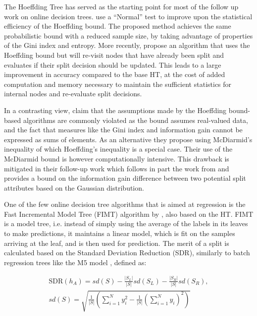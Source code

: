The Hoeffding Tree has served as the starting point for most of the follow up work on
online decision trees. \citet{vfdt-normal} use a ``Normal'' test to improve
upon the statistical efficiency of the Hoeffding bound. The proposed method achieves
the same probabilistic bound with a reduced sample size, by taking
advantage of properties of the Gini index and entropy. More recently,
\citet{efdt} propose an algorithm that uses the Hoeffding bound but
will re-visit nodes that have already been split and evaluates if their
split decision should be updated. This leads to a large improvement in accuracy
compared to the base HT,
at the cost of added computation and memory necessary to maintain
the sufficient statistics for internal nodes and re-evaluate split
decisions.

In a contrasting view, \citet{vfdt-mcdiarmid} claim that the assumptions made
by the Hoeffding bound-based algorithms are commonly violated as the bound assumes
real-valued data, and the fact that measures like the Gini index and information
gain cannot be expressed as sums of elements. As an alternative they propose
using McDiarmid's inequality of which Hoeffding's inequality is a special case.
Their use of the McDiarmid
bound is however computationally intensive. This drawback is mitigated
in their follow-up work \cite{vfdt-gaussian} which follows in part the work from \citet{vfdt-normal}
and provides a bound on the information gain difference between two potential
split attributes based on the Gaussian distribution.

One of the few online decision tree algorithms that is aimed at regression
is the Fast Incremental Model Tree (FIMT) algorithm by \citet{fimt}, also
based on the HT. FIMT
is a model tree, i.e. instead of simply using the average of the labels
in its leaves to make predictions, it maintains a linear model, which is
fit on the samples arriving at the leaf, and is then used for prediction.
The merit of a split is calculated based on the Standard Deviation Reduction (SDR),
similarly to batch regression trees like the M5 model \cite{m5-tree}, defined as:

\begin{equation}
\begin{split}
\text{SDR}(h_A)=sd(S)-\frac{|S_L|}{|S|}sd\left(S_{L}\right)-\frac{|S_R|}{|S|}sd\left(S_{R}\right), \\
sd(S) = \sqrt{\frac{1}{|S|}\left(\sum_{i=1}^{N}y_{i}^{2}-\frac{1}{|S|}\left(\sum_{i=1}^{N}y_{i}\right)^{2}\right)}
\end{split}
\end{equation}

